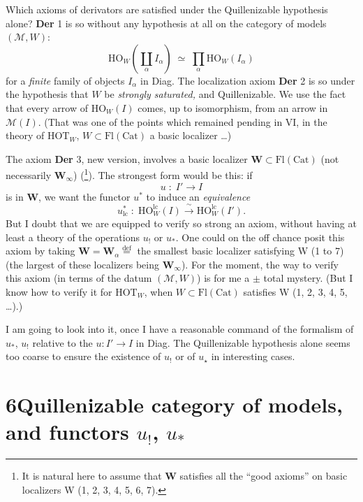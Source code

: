 Which axioms of derivators are satisfied under the Quillenizable hypothesis alone? \textbf{Der} 1 is so without any hypothesis at all on the category of models $(\mathcal{M},W)$:
\[ \mathrm{HO}_{W}(\coprod_{\alpha} I_{\alpha}) \;\simeq\; \prod_{\alpha} \mathrm{HO}_{W}(I_{\alpha}) \]
for a \textit{finite} family of objects $I_{\alpha}$ in Diag. The localization axiom \textbf{Der} 2 is so under the hypothesis that $W$ be \textit{strongly saturated,} and Quillenizable. We use the fact that every arrow of $\mathrm{HO}_{W}(I)$ comes, up to isomorphism, from an arrow in $\mathcal{M}(I)$. (That was one of the points which remained pending in VI, in the theory of $\mathrm{HOT}_{W}$, $W \subset \mathrm{Fl}(\mathrm{Cat})$ a basic localizer \dots)

The axiom \textbf{Der} 3, new version, involves a basic localizer $\mathbf{W} \subset \mathrm{Fl}(\mathrm{Cat})$ (not necessarily $\mathbf{W}_{\infty}$) (\footnote[33]{It is natural here to assume that $\mathbf{W}$ satisfies all the ``good axioms'' on basic localizers W (1, 2, 3, 4, 5, 6, 7).}). The strongest form would be this: if
\[ u \;:\; I' \longrightarrow I \]
is in $\mathbf{W}$, we want the functor $u^{*}$ to induce an \textit{equivalence}
\[ u_{\mathrm{lc}}^{*} \;:\; \mathrm{HO}_{W}^{\mathrm{lc}}(I) \xrightarrow{\;\sim\;} \mathrm{HO}_{W}^{\mathrm{lc}}(I'). \]
But I doubt that we are equipped to verify so strong an axiom, without having at least a theory of the operations $u_{!}$ or $u_{*}$. One could on the off chance posit this axiom by taking $\mathbf{W} = \mathbf{W}_{\alpha} \overset{\text{def}}{=}$ the smallest basic localizer satisfying W (1 to 7) (the largest of
these localizers being $\mathbf{W}_{\infty}$). For the moment, the way to verify this axiom (in terms of the datum $(\mathcal{M},W)$) is for me a $\pm$ total mystery. (But I know how to verify it for $\mathrm{HOT}_{W}$, when $W \subset \mathrm{Fl}(\mathrm{Cat})$ satisfies W (1, 2, 3, 4, 5, \dots).)

I am going to look into it, once I have a reasonable command of the formalism of $u_{*}$, $u_{!}$ relative to the $u : I' \longrightarrow I$ in Diag. The Quillenizable hypothesis alone seems too coarse to ensure the existence of $u_{!}$ or of $u_{\star}$ in interesting cases. %

\noindent{}

\section*{6\quad Quillenizable category of models, and functors $u_{!}$, $u_{*}$}

